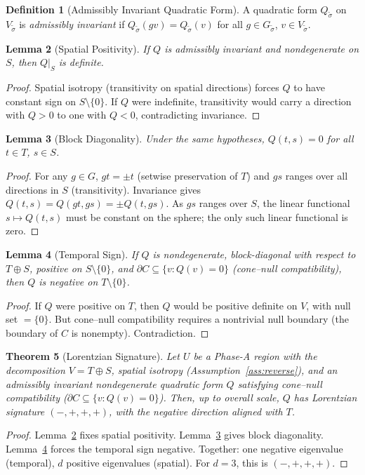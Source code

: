 \documentclass[11pt,a4paper]{article}
\newtheorem{theorem}{Theorem}[section]
\newtheorem{lemma}[theorem]{Lemma}
\theoremstyle{definition}
\newtheorem{definition}[theorem]{Definition}
\theoremstyle{remark}
\begin{document}
\begin{definition}[Admissibly Invariant Quadratic Form]\label{def:quadform}
A quadratic form $Q_{\tilde{\sigma}}$ on $V_{\tilde{\sigma}}$ is \emph{admissibly invariant} if $Q_{\tilde{\sigma}}(gv) = Q_{\tilde{\sigma}}(v)$ for all $g \in G_{\tilde{\sigma}}$, $v \in V_{\tilde{\sigma}}$.
\end{definition}

\begin{lemma}[Spatial Positivity]\label{lem:spatial}
If $Q$ is admissibly invariant and nondegenerate on $S$, then $Q|_S$ is definite.
\end{lemma}
\begin{proof}
Spatial isotropy (transitivity on spatial directions) forces $Q$ to have constant sign on $S \setminus \{0\}$. If $Q$ were indefinite, transitivity would carry a direction with $Q > 0$ to one with $Q < 0$, contradicting invariance.
\end{proof}

\begin{lemma}[Block Diagonality]\label{lem:block}
Under the same hypotheses, $Q(t, s) = 0$ for all $t \in T$, $s \in S$.
\end{lemma}
\begin{proof}
For any $g \in G$, $gt = \pm t$ (setwise preservation of $T$) and $gs$ ranges over all directions in $S$ (transitivity). Invariance gives $Q(t, s) = Q(gt, gs) = \pm Q(t, gs)$. As $gs$ ranges over $S$, the linear functional $s \mapsto Q(t, s)$ must be constant on the sphere; the only such linear functional is zero.
\end{proof}

\begin{lemma}[Temporal Sign]\label{lem:temporal}
If $Q$ is nondegenerate, block-diagonal with respect to $T \oplus S$, positive on $S \setminus \{0\}$, and $\partial C \subseteq \{v : Q(v) = 0\}$ (cone--null compatibility), then $Q$ is negative on $T \setminus \{0\}$.
\end{lemma}
\begin{proof}
If $Q$ were positive on $T$, then $Q$ would be positive definite on $V$, with null set $= \{0\}$. But cone--null compatibility requires a nontrivial null boundary (the boundary of $C$ is nonempty). Contradiction.
\end{proof}

\begin{theorem}[Lorentzian Signature]\label{thm:lorentz}
Let $U$ be a Phase-A region with the decomposition $V = T \oplus S$, spatial isotropy (Assumption~\ref{ass:reverse}), and an admissibly invariant nondegenerate quadratic form $Q$ satisfying cone--null compatibility ($\partial C \subseteq \{v : Q(v) = 0\}$). Then, up to overall scale, $Q$ has Lorentzian signature $(-,+,+,+)$, with the negative direction aligned with $T$.
\end{theorem}
\begin{proof}
Lemma~\ref{lem:spatial} fixes spatial positivity. Lemma~\ref{lem:block} gives block diagonality. Lemma~\ref{lem:temporal} forces the temporal sign negative. Together: one negative eigenvalue (temporal), $d$ positive eigenvalues (spatial). For $d = 3$, this is $(-,+,+,+)$.
\end{proof}
\end{document}
